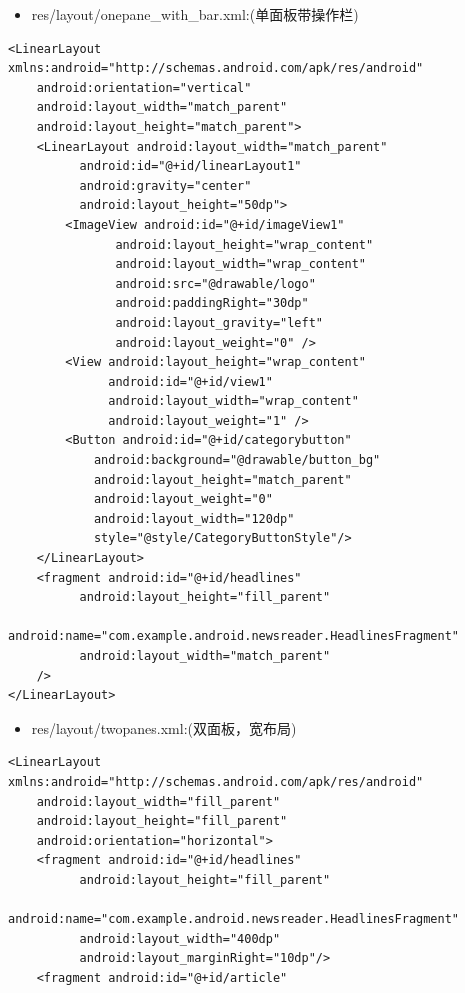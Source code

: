 \documentclass[9pt, b5paper]{article}
\begin{document}
\begin{enumerate}
\begin{enumerate}
\begin{enumerate}
\begin{itemize}
\begin{verbatim}
\end{verbatim}
\begin{itemize}
\item res/layout/onepane\_with\_bar.xml:(单面板带操作栏)
\end{itemize}
\begin{verbatim}
<LinearLayout xmlns:android="http://schemas.android.com/apk/res/android"  
    android:orientation="vertical"  
    android:layout_width="match_parent"  
    android:layout_height="match_parent">  
    <LinearLayout android:layout_width="match_parent"   
          android:id="@+id/linearLayout1"    
          android:gravity="center"  
          android:layout_height="50dp">  
        <ImageView android:id="@+id/imageView1"   
               android:layout_height="wrap_content"  
               android:layout_width="wrap_content"  
               android:src="@drawable/logo"  
               android:paddingRight="30dp"  
               android:layout_gravity="left"  
               android:layout_weight="0" />  
        <View android:layout_height="wrap_content"   
              android:id="@+id/view1"  
              android:layout_width="wrap_content"  
              android:layout_weight="1" />  
        <Button android:id="@+id/categorybutton"  
            android:background="@drawable/button_bg"  
            android:layout_height="match_parent"  
            android:layout_weight="0"  
            android:layout_width="120dp"  
            style="@style/CategoryButtonStyle"/>  
    </LinearLayout>  
    <fragment android:id="@+id/headlines"   
          android:layout_height="fill_parent"  
          android:name="com.example.android.newsreader.HeadlinesFragment"  
          android:layout_width="match_parent" 
    />  
</LinearLayout>
\end{verbatim}
\begin{itemize}
\item res/layout/twopanes.xml:(双面板，宽布局)
\end{itemize}
\begin{verbatim}
<LinearLayout xmlns:android="http://schemas.android.com/apk/res/android"
    android:layout_width="fill_parent"
    android:layout_height="fill_parent"
    android:orientation="horizontal">
    <fragment android:id="@+id/headlines"
          android:layout_height="fill_parent"
          android:name="com.example.android.newsreader.HeadlinesFragment"
          android:layout_width="400dp"
          android:layout_marginRight="10dp"/>
    <fragment android:id="@+id/article"

\end{verbatim}
\end{itemize}
\end{enumerate}
\end{enumerate}
\end{enumerate}
\end{document}
